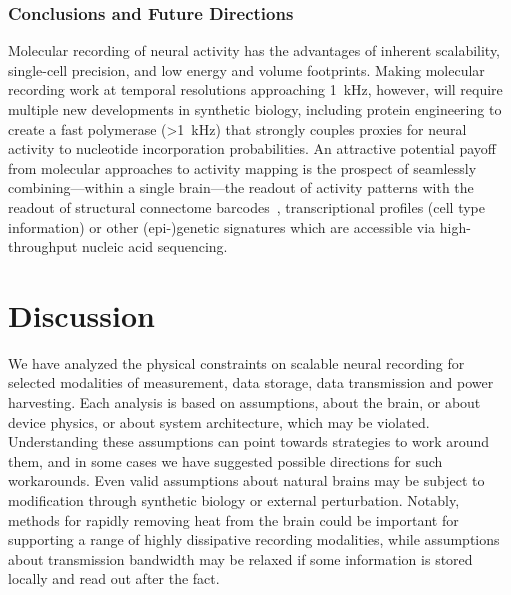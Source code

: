 \subsubsection{Conclusions and Future Directions}

Molecular recording of neural activity has the advantages of inherent scalability, single-cell precision, and low energy and volume footprints.
Making molecular recording work at temporal resolutions approaching \SI{1}{\kHz}, however, will require multiple new developments in synthetic biology, including protein engineering to create a fast polymerase (\SI{>1}{\kHz}) that strongly couples proxies for neural activity to nucleotide incorporation probabilities.
An attractive potential payoff from molecular approaches to activity mapping is the prospect of seamlessly combining---within a single brain---the readout of activity patterns with the readout of structural connectome barcodes~\cite{zador12}, transcriptional profiles (cell type information) or other (epi-)genetic signatures which are accessible via high-throughput nucleic acid sequencing.


\section{Discussion}

We have analyzed the physical constraints on scalable neural recording for selected modalities of measurement, data storage, data transmission and power harvesting.
Each analysis is based on assumptions, about the brain, or about device physics, or about system architecture, which may be violated.
Understanding these assumptions can point towards strategies to work around them, and in some cases we have suggested possible directions for such workarounds.
Even valid assumptions about natural brains may be subject to modification through synthetic biology or external perturbation.
Notably, methods for rapidly removing heat from the brain could be important for supporting a range of highly dissipative recording modalities, while assumptions about transmission bandwidth may be relaxed if some information is stored locally and read out after the fact.

